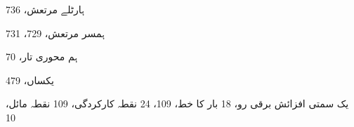 \begin{theindex}
\indexspace

\item ہارٹلے مرتعش، 736
\item ہمسر مرتعش، 729، 731
\item ہم محوری تار، 70

\indexspace

\item یکساں، 479
\item یک سمتی 
     \subitem افزائش برقی رو، 18 
     \subitem بار کا خط، 109، 24 
     \subitem نقطہ کارکردگی، 109 
     \subitem نقطہ مائل، 10

\end{theindex}
